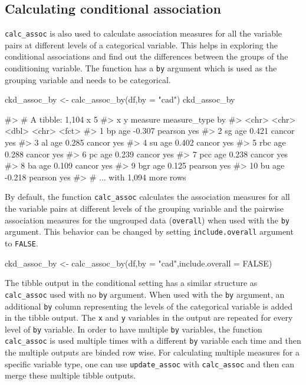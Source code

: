 \hypertarget{calculating-conditional-association}{%
\subsection{Calculating conditional
association}\label{calculating-conditional-association}}

\texttt{calc\_assoc} is also used to calculate association measures for
all the variable pairs at different levels of a categorical variable.
This helps in exploring the conditional associations and find out the
differences between the groups of the conditioning variable. The
function has a \texttt{by} argument which is used as the grouping
variable and needs to be categorical.

\begin{Schunk}
\begin{Sinput}
ckd_assoc_by <- calc_assoc_by(df,by = "cad")
ckd_assoc_by
\end{Sinput}
\begin{Soutput}
#> # A tibble: 1,104 x 5
#>    x     y     measure measure_type by   
#>    <chr> <chr>   <dbl> <chr>        <fct>
#>  1 bp    age    -0.307 pearson      yes  
#>  2 sg    age     0.421 cancor       yes  
#>  3 al    age     0.285 cancor       yes  
#>  4 su    age     0.402 cancor       yes  
#>  5 rbc   age     0.288 cancor       yes  
#>  6 pc    age     0.239 cancor       yes  
#>  7 pcc   age     0.238 cancor       yes  
#>  8 ba    age     0.109 cancor       yes  
#>  9 bgr   age     0.125 pearson      yes  
#> 10 bu    age    -0.218 pearson      yes  
#> # ... with 1,094 more rows
\end{Soutput}
\end{Schunk}

By default, the function \texttt{calc\_assoc} calculates the association
measures for all the variable pairs at different levels of the grouping
variable and the pairwise association measures for the ungrouped data
(\texttt{overall}) when used with the \texttt{by} argument. This
behavior can be changed by setting \texttt{include.overall} argument to
\texttt{FALSE}.

\begin{Schunk}
\begin{Sinput}
ckd_assoc_by <- calc_assoc_by(df,by = "cad",include.overall = FALSE)
\end{Sinput}
\end{Schunk}

The tibble output in the conditional setting has a similar structure as
\texttt{calc\_assoc} used with no \texttt{by} argument. When used with
the \texttt{by} argument, an additional \texttt{by} column representing
the levels of the categorical variable is added in the tibble output.
The \texttt{x} and \texttt{y} variables in the output are repeated for
every level of \texttt{by} variable. In order to have multiple
\texttt{by} variables, the function \texttt{calc\_assoc} is used
multiple times with a different \texttt{by} variable each time and then
the multiple outputs are binded row wise. For calculating multiple
measures for a specific variable type, one can use
\texttt{update\_assoc} with \texttt{calc\_assoc} and then can merge
these multiple tibble outputs.

